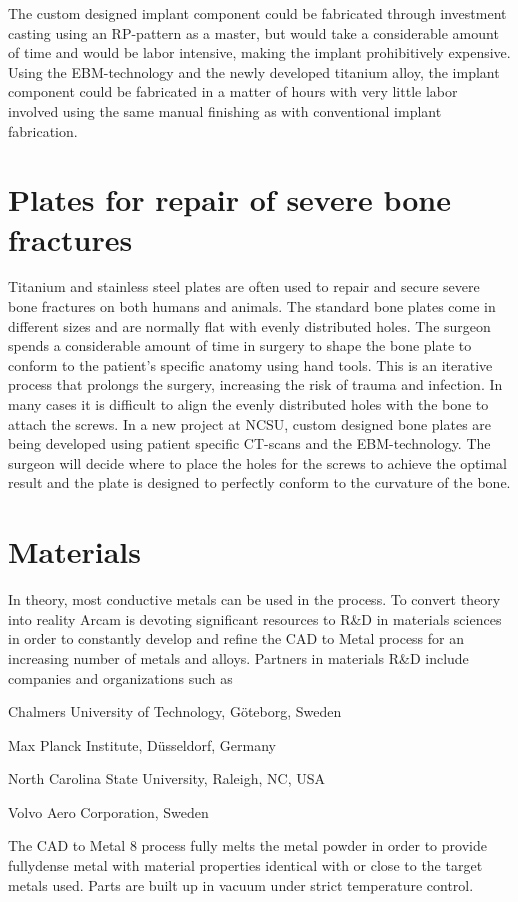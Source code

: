 \documentclass[10pt]{article}
\begin{document}
The custom designed implant component could be fabricated through investment casting using an RP-pattern as a master, but would take a considerable amount of time and would be labor intensive, making the implant prohibitively expensive. Using the EBM-technology and the newly developed titanium alloy, the implant component could be fabricated in a matter of hours with very little labor involved using the same manual finishing as with conventional implant fabrication.

\section*{Plates for repair of severe bone fractures}
Titanium and stainless steel plates are often used to repair and secure severe bone fractures on both humans and animals. The standard bone plates come in different sizes and are normally flat with evenly distributed holes. The surgeon spends a considerable amount of time in surgery to shape the bone plate to conform to the patient's specific anatomy using hand tools. This is an iterative process that prolongs the surgery, increasing the risk of trauma and infection. In many cases it is difficult to align the evenly distributed holes with the bone to attach the screws. In a new project at NCSU, custom designed bone plates are being developed using patient specific CT-scans and the EBM-technology. The surgeon will decide where to place the holes for the screws to achieve the optimal result and the plate is designed to perfectly conform to the curvature of the bone.

\section*{Materials}
In theory, most conductive metals can be used in the process. To convert theory into reality Arcam is devoting significant resources to R\&D in materials sciences in order to constantly develop and refine the CAD to Metal process for an increasing number of metals and alloys. Partners in materials R\&D include companies and organizations such as

Chalmers University of Technology, Göteborg, Sweden

Max Planck Institute, Düsseldorf, Germany

North Carolina State University, Raleigh, NC, USA

Volvo Aero Corporation, Sweden

The CAD to Metal 8 process fully melts the metal powder in order to provide fullydense metal with material properties identical with or close to the target metals used. Parts are built up in vacuum under strict temperature control.
\end{document}
